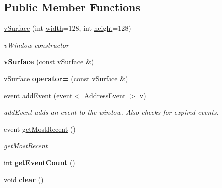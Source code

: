 \subsection*{Public Member Functions}
\begin{DoxyCompactItemize}
\item 
\hyperlink{classev_1_1vSurface_afb642ce656aee165c54a2238474599c0}{v\+Surface} (int \hyperlink{classev_1_1vSurface_a9666b7ae2580bf5647f65306f911825e}{width}=128, int \hyperlink{classev_1_1vSurface_ab3cf3df2f4fcb7eb5d89e0c5d1a5eeff}{height}=128)
\begin{DoxyCompactList}\small\item\em v\+Window constructor \end{DoxyCompactList}\item 
{\bfseries v\+Surface} (const \hyperlink{classev_1_1vSurface}{v\+Surface} \&)\hypertarget{classev_1_1vSurface_a592c1c79ff294f34e28503d7c7278b8f}{}\label{classev_1_1vSurface_a592c1c79ff294f34e28503d7c7278b8f}

\item 
\hyperlink{classev_1_1vSurface}{v\+Surface} {\bfseries operator=} (const \hyperlink{classev_1_1vSurface}{v\+Surface} \&)\hypertarget{classev_1_1vSurface_af779bb51b4c9f748a0cd38117cf5e1f9}{}\label{classev_1_1vSurface_af779bb51b4c9f748a0cd38117cf5e1f9}

\item 
event \hyperlink{classev_1_1vSurface_abb5a735613b4165a49a0da37f0770055}{add\+Event} (event$<$ \hyperlink{classev_1_1AddressEvent}{Address\+Event} $>$ v)
\begin{DoxyCompactList}\small\item\em add\+Event adds an event to the window. Also checks for expired events. \end{DoxyCompactList}\item 
event \hyperlink{classev_1_1vSurface_a4772b37a82726d86313438f5d89b2f62}{get\+Most\+Recent} ()
\begin{DoxyCompactList}\small\item\em get\+Most\+Recent \end{DoxyCompactList}\item 
int {\bfseries get\+Event\+Count} ()\hypertarget{classev_1_1vSurface_aa90e7d977149ee42dff7a2735b367a2b}{}\label{classev_1_1vSurface_aa90e7d977149ee42dff7a2735b367a2b}

\item 
void {\bfseries clear} ()\hypertarget{classev_1_1vSurface_a222eadfa9d900d22148d1ffb0bb68661}{}\label{classev_1_1vSurface_a222eadfa9d900d22148d1ffb0bb68661}


\end{DoxyCompactItemize}
